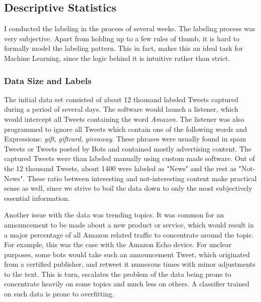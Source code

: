 	\subsection{Descriptive Statistics}
		I conducted the labeling in the process of several weeks. The labeling process was very subjective. Apart from holding up to a few rules of thumb, it is hard to formally model the labeling pattern. This in fact, makes this an ideal task for Machine Learning, since the logic behind it is intuitive rather than strict.
		
		\subsubsection{Data Size and Labels}
			The initial data set consisted of about 12 thousand labeled Tweets captured during a period of several days. The software would launch a listener, which would intercept all Tweets containing the word \textit{Amazon}. The listener was also programmed to ignore all Tweets which contain one of the following words and Expressions: \textit{gift}, \textit{giftcard}, \textit{giveaway}. These phrases were usually found in spam Tweets or Tweets posted by Bots and contained mostly advertising content. The captured Tweets were than labeled manually using custom made software. Out of the 12 thousand Tweets, about 1400 were labeled as "News" and the rest as "Not-News". These ratio between interesting and not-interesting content make practical sense as well, since we strive to boil the data down to only the most subjectively essential information. 
			
			\par
			
			Another issue with the data was trending topics. It was common for an announcement to be made about a new product or service, which would result in a major percentage of all Amazon related traffic to concentrate around the topic. For example, this was the case with the Amazon Echo device. For unclear purposes, some bots would take such an announcement Tweet, which originated from a certified publisher, and retweet it numerous times with minor adjustments to the text. This is turn, escalates the problem of the data being prone to concentrate heavily on some topics and much less on others. A classifier trained on such data is prone to overfitting.
			
